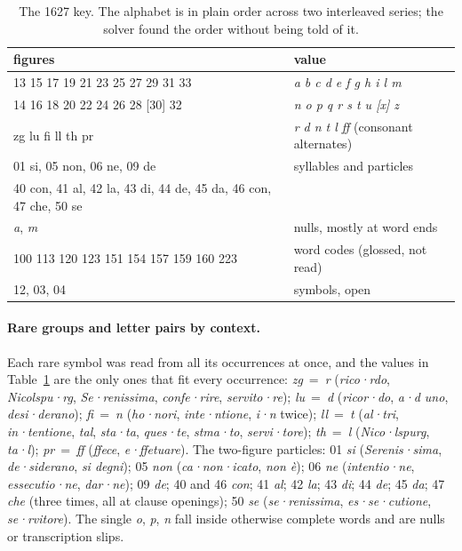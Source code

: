 \documentclass[11pt]{article}
\begin{document}
\begin{table}[t]
\centering\small
\begin{tabular}{@{}ll@{}}
\toprule
figures & value \\
\midrule
13 15 17 19 21 23 25 27 29 31 33 & \emph{a b c d e f g h i l m} \\
14 16 18 20 22 24 26 28 [30] 32 & \emph{n o p q r s t u [x] z} \\
zg lu fi ll th pr & \emph{r d n t l ff} (consonant alternates) \\
01 si, 05 non, 06 ne, 09 de & syllables and particles \\
40 con, 41 al, 42 la, 43 di, 44 de, 45 da, 46 con, 47 che, 50 se & \\
\emph{a}, \emph{m} & nulls, mostly at word ends \\
100 113 120 123 151 154 157 159 160 223 & word codes (glossed, not read) \\
12, 03, 04 & symbols, open \\
\bottomrule
\end{tabular}
\caption{\label{tab:warsawkey} The 1627 key. The alphabet is in plain order across two interleaved series; the solver found the order without being told of it.}
\end{table}

\paragraph{Rare groups and letter pairs by context.} Each rare symbol was read from all its occurrences at once, and the values in Table~\ref{tab:warsawkey} are the only ones that fit every occurrence: \emph{zg}~=~\emph{r} (\emph{rico·rdo}, \emph{Nicolspu·rg}, \emph{Se·renissima}, \emph{confe·rire}, \emph{servito·re}); \emph{lu}~=~\emph{d} (\emph{ricor·do}, \emph{a·d uno}, \emph{desi·derano}); \emph{fi}~=~\emph{n} (\emph{ho·nori}, \emph{inte·ntione}, \emph{i·n} twice); \emph{ll}~=~\emph{t} (\emph{al·tri}, \emph{in·tentione}, \emph{tal}, \emph{sta·ta}, \emph{ques·te}, \emph{stma·to}, \emph{servi·tore}); \emph{th}~=~\emph{l} (\emph{Nico·lspurg}, \emph{ta·l}); \emph{pr}~=~\emph{ff} (\emph{ffece}, \emph{e·ffetuare}). The two-figure particles: 01 \emph{si} (\emph{Serenis·sima}, \emph{de·siderano}, \emph{si degni}); 05 \emph{non} (\emph{ca·non·icato}, \emph{non \`e}); 06 \emph{ne} (\emph{intentio·ne}, \emph{essecutio·ne}, \emph{dar·ne}); 09 \emph{de}; 40 and 46 \emph{con}; 41 \emph{al}; 42 \emph{la}; 43 \emph{di}; 44 \emph{de}; 45 \emph{da}; 47 \emph{che} (three times, all at clause openings); 50 \emph{se} (\emph{se·renissima}, \emph{es·se·cutione}, \emph{se·rvitore}). The single \emph{o}, \emph{p}, \emph{n} fall inside otherwise complete words and are nulls or transcription slips.
\end{document}
